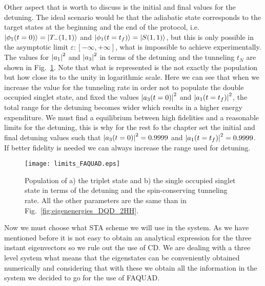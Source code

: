 Other aspect that is worth to discuss is the initial and final values for the detuning. The ideal scenario would be that the adiabatic state corresponds to the target states at the beginning and the end of the protocol, i.e. $\ket{\phi_1(t=0)}=\ket{T_-(1,1)}$ and $\ket{\phi_1(t=t_f)}=\ket{S(1,1)}$, but this is only possible in the asymptotic limit $\varepsilon:[-\infty,+\infty]$, what is impossible to achieve experimentally. The values for $\abs{a_1}^2$ and $\abs{a_3}^2$ in terms of the detuning and the tunneling $t_N$ are shown in Fig.~\ref{fig:limits_FAQUAD}. Note that what is represented is the not exactly the population but how close its to the unity in logarithmic scale. Here we can see that when we increase the value for the tunneling rate in order not to populate the double occupied singlet state, and fixed the values $\abs{a_3(t=0)}^2$ and $\abs{a_1(t=t_f)}^2$, the total range for the detuning becomes wider which results in a higher energy expenditure. We must find a equilibrium between high fidelities and a reasonable limits for the detuning, this is why for the rest fo the chapter set the initial and final detuning values such that $\abs{a_3(t=0)}^2=0.9999$ and $\abs{a_1(t=t_f)}^2=0.9999$. If better fidelity is needed we can always  increase the range used for detuning.\\
\begin{figure}[!htb]
	\centering
	\texttt{[image: limits\_FAQUAD.eps]}
	\caption{Population of a) the triplet state and b) the single occupied singlet state in terms of the detuning and the spin-conserving tunneling rate. All the other parameters are the same than in Fig.~\ref{fig:eigenenergies_DQD_2HH}.}
	\label{fig:limits_FAQUAD}
\end{figure}

Now we must choose what STA scheme we will use in the system. As we have mentioned before it is not easy to obtain an analytical expression for the three instant eigenvectors so we rule out the use of CD. We are dealing with a three level system what means that the eigenstates can be conveniently obtained numerically and considering that with these we obtain all the information in the system we decided to go for the use of FAQUAD.

